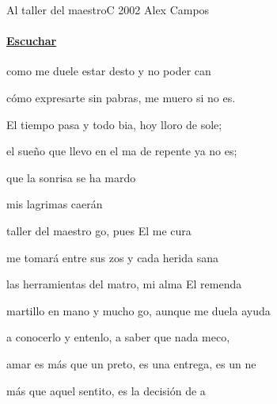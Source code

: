 \documentclass[12pt, spanish]{book}
\newcommand{\NotCCLIed}{\relax}
\begin{document}
    \hypersetup{pageanchor=true}
    \ifWordBk
    \twocolumn
    \fi
    \begin{song}{Al taller del maestro}{C}
        {2002} %
        {Alex Campos}
        {} %
        {} %
        \ifChordBk
        \paragraph{\mbox{}\hfill\protect\href{https://open.spotify.com/intl-es/track/0bhx7UhWYPyZzARQG2lS4b}{Escuchar}\mbox{}\hfill}
        \fi


        \begin{SBOpGroup}
             como me duele estar desto y no poder can

            cómo expresarte sin pabras, me muero si no es.

            El tiempo pasa y todo bia, hoy lloro de sole;

            el sueño que llevo en el ma de repente ya no es;

            que la sonrisa se ha mardo

            mis lagrimas caerán 
        \end{SBOpGroup}

        \begin{SBChorus}
             taller del maestro go, pues El me cura

            me tomará entre sus zos y cada herida sana

            las herramientas del matro, mi alma El remenda

            martillo en mano y mucho go, aunque me duela ayuda

            a conocerlo y entenlo, a saber que nada meco,

            amar es más que un preto, es una entrega, es un ne

            más que aquel sentito, es la decisión de a
        \end{SBChorus}


\end{song}
\end{document}
